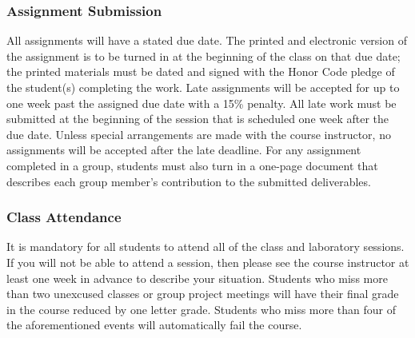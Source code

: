 \vspace{-.3in}
\subsubsection*{Assignment Submission}

All assignments will have a stated due date. The printed and electronic version of the assignment is to be turned in at
the beginning of the class on that due date; the printed materials must be dated and signed with the Honor Code pledge
of the student(s) completing the work.  Late assignments will be accepted for up to one week past the assigned due date
with a 15\% penalty. All late work must be submitted at the beginning of the session that is scheduled one week
after the due date. Unless special arrangements are made with the course instructor, no assignments will be accepted
after the late deadline. For any assignment completed in a group, students must also turn in a one-page document that
describes each group member's contribution to the submitted deliverables.


\vspace{-.20in}
\subsubsection*{Class Attendance}


It is mandatory for all students to attend all of the class and laboratory sessions. If you will not be able to attend a
session, then please see the course instructor at least one week in advance to describe your situation.  Students who
miss more than two unexcused classes or group project meetings will have their final grade in the course reduced by one
letter grade. Students who miss more than four of the aforementioned events will automatically fail the course.

